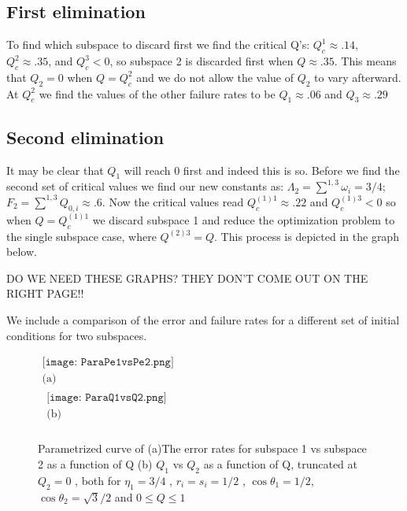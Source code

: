 \documentclass[12pt,oneside,english,reqno]{amsbook}
\numberwithin{section}{chapter}
\numberwithin{equation}{section}
\numberwithin{figure}{section}
\begin{document}
\subsection{First elimination}

To find which subspace to discard first we find the critical Q's: $Q^1_c \approx .14$, $Q^2_c \approx .35$, and $Q^3_c <0$, so subspace 2 is discarded first when $Q \approx .35$.  This means that $Q_2 =0$ when $Q = Q^2_c$ and we do not allow the value of $Q_2$ to vary afterward. At $Q^2_c$ we find the values of the other failure rates to be $Q_1 \approx .06$ and $Q_3 \approx .29$

\subsection{Second elimination}

It may be clear that $Q_1$ will reach 0 first and indeed this is so.  Before we find the second set of critical values we find our new constants as: $\Lambda_2 = \sum^{1,3}\omega_i = 3/4$; $ F_2 = \sum^{1,3} Q_{0,i} \approx .6$. Now the critical values read $Q^{(1)1}_c \approx .22$ and $Q^{(1)3}_c <0$ so when $ Q = Q^{(1)1}_c$ we discard subspace 1 and reduce the optimization problem to the single subspace case, where $Q^{(2)3} = Q$. This process is depicted in the graph below. 






\iffalse

DO WE NEED THESE GRAPHS? THEY DON'T COME OUT ON THE RIGHT PAGE!!


We include a comparison of the error and failure rates for a different set of initial conditions for two subspaces.

\begin{figure}[b]
\centering
$%
\begin{array}{c}
\texttt{[image: ParaPe1vsPe2.png]} \\ 
\mbox{(a)} \\ 
\begin{array}{c}
\texttt{[image: ParaQ1vsQ2.png]} \\ 
\mbox{(b)} \\ 
\end{array}%
\end{array}%
$%
\caption{Parametrized curve of (a)The error rates for subspace 1 vs subspace 2 as a function of Q (b) $Q_1$ vs $Q_2$ as a function of Q, truncated at $Q_2 = 0$
, both for $\eta_1 = 3/4$ , $r_i = s_i = 1/2$ , $\cos \theta_1 =1/2$, $\cos \theta_2 = \sqrt{3}/2$ and $0 \leq Q \leq 1$}
\label{fig:Graphs}
\end{figure}
\end{document}
